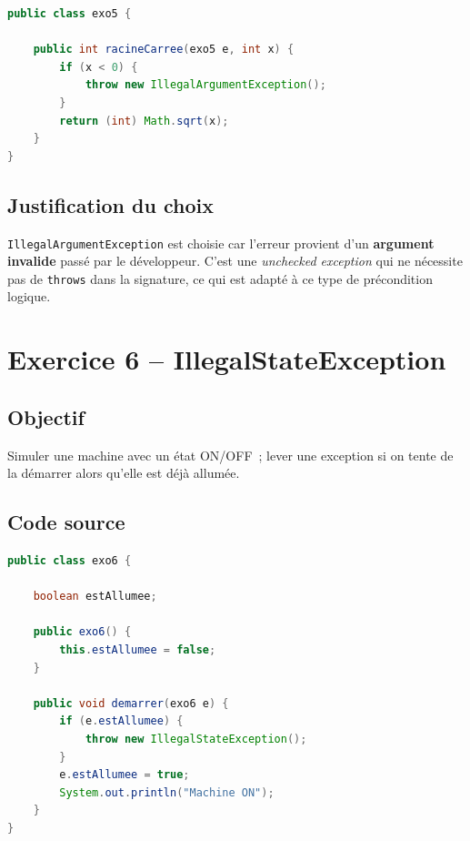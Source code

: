 \begin{lstlisting}[language=Java, caption={exo5.java -- IllegalArgumentException}]
public class exo5 {

    public int racineCarree(exo5 e, int x) {
        if (x < 0) {
            throw new IllegalArgumentException();
        }
        return (int) Math.sqrt(x);
    }
}
\end{lstlisting}

\subsection{Justification du choix}

\begin{accentbox}
    \centering\vspace{0.3cm}
    {\large \texttt{IllegalArgumentException} est choisie car l'erreur provient
    d'un \textbf{argument invalide} passé par le développeur.
    C'est une \textit{unchecked exception} qui ne nécessite pas de
    \texttt{throws} dans la signature, ce qui est adapté à ce type de
    précondition logique.}
    \vspace{0.3cm}
\end{accentbox}

\section{Exercice 6 -- IllegalStateException}

\subsection{Objectif}

Simuler une machine avec un état ON/OFF~; lever une exception si on tente de
la démarrer alors qu'elle est déjà allumée.

\subsection{Code source}

\begin{lstlisting}[language=Java, caption={exo6.java -- IllegalStateException}]
public class exo6 {

    boolean estAllumee;

    public exo6() {
        this.estAllumee = false;
    }

    public void demarrer(exo6 e) {
        if (e.estAllumee) {
            throw new IllegalStateException();
        }
        e.estAllumee = true;
        System.out.println("Machine ON");
    }
}
\end{lstlisting}

